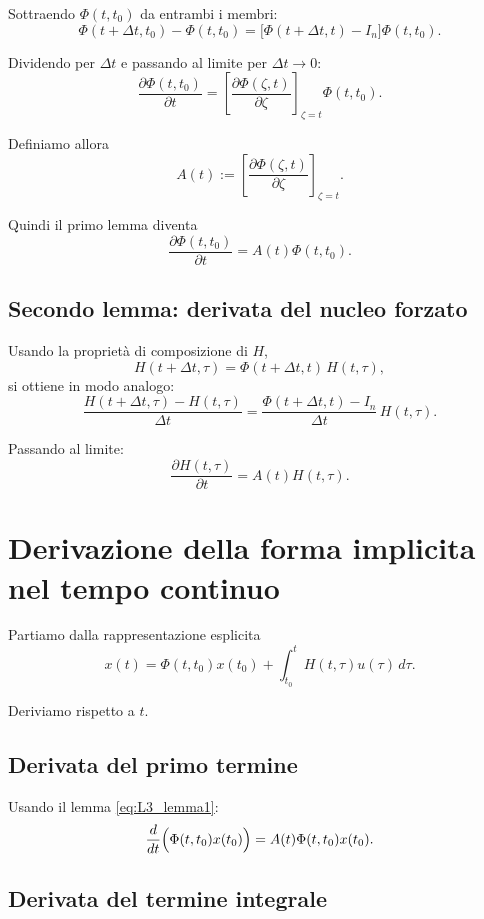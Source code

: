 Sottraendo $\Phi(t,t_0)$ da entrambi i membri:
\[
\Phi(t+\Delta t,t_0)-\Phi(t,t_0)
=
\bigl[\Phi(t+\Delta t,t)-I_n\bigr]\Phi(t,t_0).
\]

Dividendo per $\Delta t$ e passando al limite per $\Delta t\to 0$:
\[
\frac{\partial \Phi(t,t_0)}{\partial t}
=
\left[
\frac{\partial \Phi(\zeta,t)}{\partial \zeta}
\right]_{\zeta=t}
\Phi(t,t_0).
\]

Definiamo allora
\begin{equation}
A(t):=
\left[
\frac{\partial \Phi(\zeta,t)}{\partial \zeta}
\right]_{\zeta=t}.
\label{eq:L3_def_A}
\end{equation}

Quindi il primo lemma diventa
\begin{equation}
\frac{\partial \Phi(t,t_0)}{\partial t}=A(t)\Phi(t,t_0).
\label{eq:L3_lemma1}
\end{equation}

\subsection{Secondo lemma: derivata del nucleo forzato}

Usando la proprietà di composizione di $H$,
\[
H(t+\Delta t,\tau)=\Phi(t+\Delta t,t)\,H(t,\tau),
\]
si ottiene in modo analogo:
\[
\frac{H(t+\Delta t,\tau)-H(t,\tau)}{\Delta t}
=
\frac{\Phi(t+\Delta t,t)-I_n}{\Delta t}\,H(t,\tau).
\]

Passando al limite:
\begin{equation}
\frac{\partial H(t,\tau)}{\partial t}=A(t)H(t,\tau).
\label{eq:L3_lemma2}
\end{equation}

\section{Derivazione della forma implicita nel tempo continuo}

Partiamo dalla rappresentazione esplicita
\[
x(t)=\Phi(t,t_0)x(t_0)+\int_{t_0}^{t}H(t,\tau)u(\tau)\,d\tau.
\]

Deriviamo rispetto a $t$.

\subsection{Derivata del primo termine}

Usando il lemma \eqref{eq:L3_lemma1}:
\[
\frac{d}{dt}\Bigl(\Phi(t,t_0)x(t_0)\Bigr)=A(t)\Phi(t,t_0)x(t_0).
\]

\subsection{Derivata del termine integrale}

